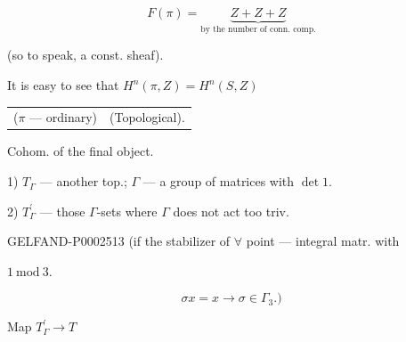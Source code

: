 \begin{center}\end{center}





\begin{equation*}F (\pi)=\underbrace{Z+Z+Z}_{\text{by the number of conn. comp.}}\end{equation*}

(so to speak, a const. sheaf).





It is easy to see that $H^n (\pi, Z)=H^n (S, Z)$

\begin{center}\begin{tabular}{@{}c@{\qquad\qquad}c@{}}($\pi$ — ordinary)&(Topological).\end{tabular}\end{center}

Cohom. of the final object.





1) $T_\Gamma$ — another top.; $\Gamma$ — a group of matrices with $\det 1$.

2) $T^\prime_\Gamma$ — those $\Gamma$-sets where $\Gamma$ does not act too triv.





\begin{GelfandAdjacentEvidence}{GELFAND-P000251}{3}
(if the stabilizer of $\forall$ point — integral matr. with




$1\ \mathrm{mod}\ 3$.

\begin{equation*}\sigma x=x\to\sigma\in\Gamma_3.)\end{equation*}
\end{GelfandAdjacentEvidence}





Map $T^\prime_\Gamma\to T$

